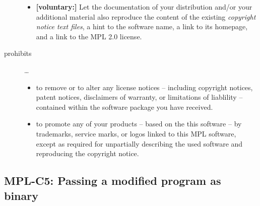 \begin{description}
\begin{itemize}
  \item \textbf{[voluntary:]} Let the documentation of your distribution and/or
  your additional material also reproduce the content of the existing
  \emph{copyright notice text files}, a hint to the software name, a link to its
  homepage, and a link to the MPL 2.0 license.
  
 \end{itemize}
 
\item[prohibits] \ldots
\begin{itemize}
  \item to remove or to alter any license notices -- including copyright
  notices, patent notices, disclaimers of warranty, or limitations of liablility
  -- contained within the software package you have received.
  \item to promote any of your products -- based on the this software -- by
  trademarks, service marks, or logos linked to this MPL software, except as
  required for unpartially describing the used software and reproducing the
  copyright notice.
\end{itemize}

\end{description}

\subsection{MPL-C5: Passing a modified program as binary}
\label{OSUC-04B-MPL} 

